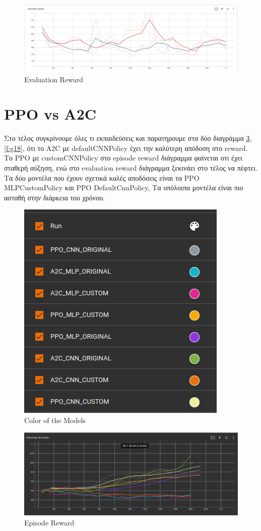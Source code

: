 \begin{figure}[ht]
	\centering
	\includegraphics[width=1\linewidth]{Results/A2C_MLP/eval_reward.png}
	\caption{ Evaluation Reward}
	\label{f:g16}	
\end{figure}
\clearpage

\section{PPO vs A2C}

Στο τέλος συγκρίνουμε όλες τι εκπαιδεύσεις και παρατηρουμε στα δύο διαγράμμα \ref{f:g17}, \ref{f:g18}, ότι το A2C με defaultCNNPolicy έχει την καλύτερη απόδοση στο reward. Το PPO με customCNNPolicy στο episode reward διάγραμμα φαίνεται οτι έχει σταθερή αύξηση, ενώ στο evaluation reward διάγραμμα ξεκινάει στο τέλος να πέφτει. Τα δύο μοντέλα που έχουν σχετικά καλές αποδόσεις είναι τα PPO MLPCustomPolicy και PPO DefaultCnnPolicy, Τα υπόλοιπα μοντέλα είναι πιο ασταθή στην διάρκεια του χρόνου.

\begin{figure}[ht]
	\centering
	\includegraphics[width=0.4\linewidth]{Results/A2CvPPO/colors.png}
	\caption{ Color of the Models}
	\label{f:g19}	
\end{figure}

\begin{figure}[ht]
	\centering
	\includegraphics[width=1\linewidth]{Results/A2CvPPO/ep_reward.png}
	\caption{ Episode Reward }
	\label{f:g17}	
\end{figure}

